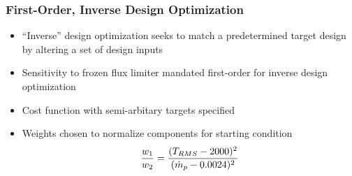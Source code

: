 \documentclass{beamer}
\begin{document}
\begin{frame}
  \frametitle{First-Order, Inverse Design Optimization}
  \begin{itemize}
    \item ``Inverse'' design optimization seeks to match a predetermined target
      design by altering a set of design inputs
    \item Sensitivity to frozen flux limiter mandated first-order for inverse
      design optimization
    \item Cost function with semi-arbitary targets specified
    \item Weights chosen to normalize components for starting condition
      \[
        \frac{w_1}{w_2} = \frac{(T_{RMS} - 2000)^2}{(\dot{m}_p - 0.0024)^2}
      \]
  \end{itemize}
\end{frame}
\end{document}

